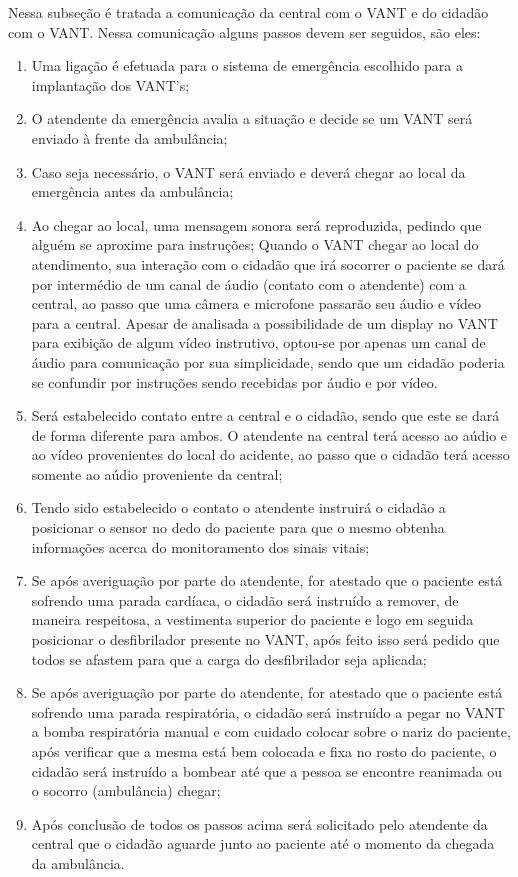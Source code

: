 Nessa subseção é tratada a comunicação da central com o VANT e do cidadão com o VANT.
Nessa comunicação alguns passos devem ser seguidos, são eles:

\begin{enumerate}
  \item Uma ligação é efetuada para o sistema de emergência escolhido para a implantação dos VANT’s;
  \item O atendente da emergência avalia a situação e decide se um VANT será enviado à frente da ambulância;
  \item Caso seja necessário, o VANT será enviado e deverá chegar ao local da emergência antes da ambulância;
  \item Ao chegar ao local, uma mensagem sonora será reproduzida, pedindo que alguém se aproxime para instruções;
  Quando o VANT chegar ao local do atendimento, sua interação com o cidadão que irá socorrer o paciente se dará por intermédio de um canal de áudio (contato com o atendente) com a central, ao passo que uma câmera e microfone passarão seu áudio e vídeo para a central. 
  Apesar de analisada a possibilidade de um display no VANT para exibição de algum vídeo instrutivo, optou-se por apenas um canal de áudio para comunicação por sua simplicidade, sendo que um cidadão poderia se confundir por instruções sendo recebidas por áudio e por vídeo.
  \item Será estabelecido contato entre a central e o cidadão, sendo que este se dará de forma diferente para ambos. O atendente na central terá acesso ao aúdio e ao vídeo provenientes do local do acidente, ao passo que o cidadão terá acesso somente ao aúdio proveniente da central;
  \item Tendo sido estabelecido o contato o atendente instruirá o cidadão a posicionar o sensor no dedo do paciente para que o mesmo obtenha informações acerca do monitoramento dos sinais vitais;
  \item Se após averiguação por parte do atendente, for atestado que o paciente está sofrendo uma parada cardíaca, o cidadão será instruído a remover, de maneira respeitosa, a vestimenta superior do paciente e logo em seguida posicionar o desfibrilador presente no VANT, após feito isso será pedido que todos se afastem para que a carga do desfibrilador seja aplicada;
  \item Se após averiguação por parte do atendente, for atestado que o paciente está sofrendo uma parada respiratória, o cidadão será instruído a pegar no VANT a bomba respiratória manual e com cuidado colocar sobre o nariz do paciente, após verificar que a mesma está bem colocada e fixa no rosto do paciente, o cidadão será instruído a bombear até que a pessoa se encontre reanimada ou o socorro (ambulância) chegar;
  \item Após conclusão de todos os passos acima será solicitado pelo atendente da central que o cidadão aguarde junto ao paciente até o momento da chegada da ambulância.

\end{enumerate}
